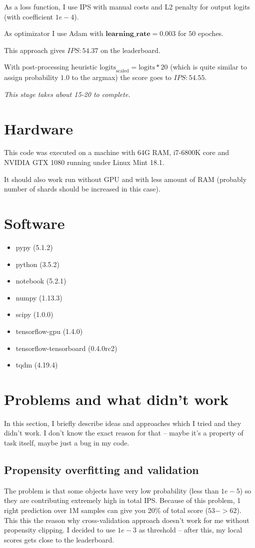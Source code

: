 \documentclass[12pt]{article}
\begin{document}
As a loss function, I use IPS with manual costs and L2 penalty for output logits (with coefficient $1e-4$).

As optimizator I use Adam with $\textbf{learning\_rate}=0.003$ for $50$ epoches.

This approach gives $IPS: 54.37$ on the leaderboard.

With post-processing heuristic $\text{logits}_{\text{scaled}} = \text{logits}*20$ (which is quite similar to assign probability $1.0$ to the argmax) the score goes to $IPS: 54.55$.

\textit{This stage takes about 15-20 to complete.}

\section{Hardware}
This code was executed on a machine with 64G RAM, i7-6800K core and NVIDIA GTX 1080 running under Linux Mint 18.1.

It should also work run without GPU and with less amount of RAM (probably number of shards should be increased in this case).

\section{Software}
\begin{itemize}
    \item  pypy (5.1.2)
    \item python (3.5.2)
    \item  notebook (5.2.1)
    \item  numpy (1.13.3)
    \item  scipy (1.0.0)
    \item  tensorflow-gpu (1.4.0)
    \item  tensorflow-tensorboard (0.4.0rc2)
    \item  tqdm (4.19.4)
\end{itemize}



\section{Problems and what didn't work}
In this section, I briefly describe ideas and approaches which I tried and they didn't work. I don't know the exact reason for that -- maybe it's a property of task itself, maybe just a bug in my code.

\subsection{Propensity overfitting and validation}
The problem is that some objects have very low probability (less than $1e-5$) so they are contributing extremely high in total IPS. Because of this problem, 1 right prediction over 1M samples can give you 20\% of total score ($53 -> 62$). This this the reason why cross-validation approach doesn't work for me without propensity clipping. I decided to use $1e-3$ as threshold -- after this, my local scores gets close to the leaderboard.
\end{document}

